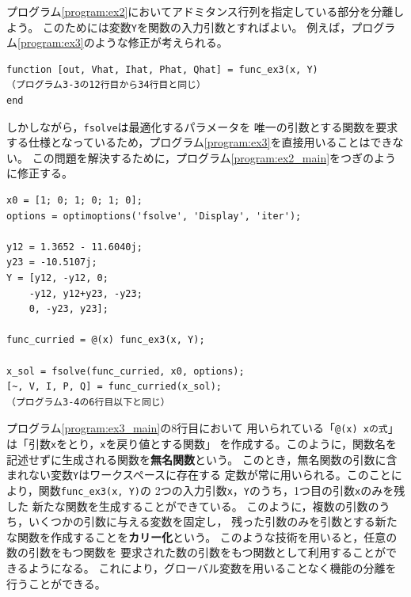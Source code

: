 \documentclass[tombow,dvipdfmx]{corona-a5-1.1}
\begin{document}
\begin{例}[アドミタンス行列の実装の分離]

プログラム\nobreak\ref{program:ex2}においてアドミタンス行列を指定している部分を分離しよう。
このためには変数\verb|Y|を関数の入力引数とすればよい。
例えば，プログラム\nobreak\ref{program:ex3}のような修正が考えられる。

\smallskip
\begin{PROGRAMA}[count, title={func\_ex3.m}]\label{program:ex3}
\begin{verbatim}
function [out, Vhat, Ihat, Phat, Qhat] = func_ex3(x, Y)
（プログラム3-3の12行目から34行目と同じ）
end
\end{verbatim}
\end{PROGRAMA}

しかしながら，\verb|fsolve|は最適化するパラメータを
唯一の引数とする関数を要求する仕様となっているため，プログラム\nobreak\ref{program:ex3}を直接用いることはできない。
この問題を解決するために，プログラム\nobreak\ref{program:ex2_main}をつぎのように修正する。

\smallskip
\begin{PROGRAMA}[count,title={main\_ex3.m}]\label{program:ex3_main}
\begin{verbatim}
x0 = [1; 0; 1; 0; 1; 0];
options = optimoptions('fsolve', 'Display', 'iter');

y12 = 1.3652 - 11.6040j;
y23 = -10.5107j;
Y = [y12, -y12, 0;
    -y12, y12+y23, -y23;
    0, -y23, y23];

func_curried = @(x) func_ex3(x, Y);

x_sol = fsolve(func_curried, x0, options);
[~, V, I, P, Q] = func_curried(x_sol);
（プログラム3-4の6行目以下と同じ）
\end{verbatim}
\end{PROGRAMA}

プログラム\nobreak\ref{program:ex3_main}の8行目において
用いられている「\verb|@(x) xの式|」は「引数\verb|x|をとり，\verb|x|を戻り値とする関数」
を作成する。このように，関数名を記述せずに生成される関数を\textbf{無名関数}という。
このとき，無名関数の引数に含まれない変数\verb|Y|はワークスペースに存在する
定数が常に用いられる。このことにより，関数\verb|func_ex3(x, Y)|の
2つの入力引数\verb|x|，\verb|Y|のうち，1つ目の引数\verb|x|のみを残した
新たな関数を生成することができている。
このように，複数の引数のうち，いくつかの引数に与える変数を固定し，
残った引数のみを引数とする新たな関数を作成することを\textbf{カリー化}という。
このような技術を用いると，任意の数の引数をもつ関数を
要求された数の引数をもつ関数として利用することができるようになる。
これにより，グローバル変数を用いることなく機能の分離を行うことができる。
\end{例}
\end{document}
